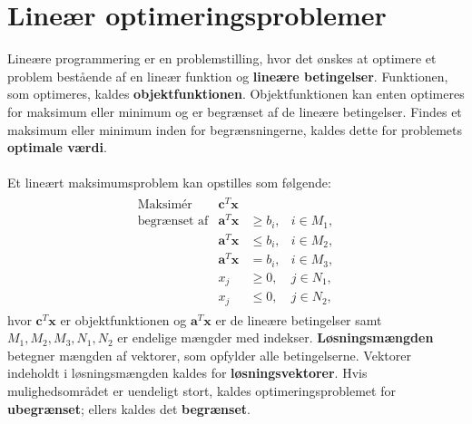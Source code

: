 \chapter{Lineær optimeringsproblemer}
%
Lineære programmering er en problemstilling, hvor det ønskes at optimere et problem bestående af en lineær funktion og \textbf{lineære betingelser}.
Funktionen, som optimeres, kaldes \textbf{objektfunktionen}.
Objektfunktionen kan enten optimeres for maksimum eller minimum og er begrænset af de lineære betingelser.
Findes et maksimum eller minimum inden for begrænsningerne, kaldes dette for problemets \textbf{optimale værdi}.
\\\\
%
Et lineært maksimumsproblem kan opstilles som følgende:
%
\begin{align*}
\begin{array}{lrll}
\text{Maksimér}		&\textbf{c}^T\textbf{x}	&			&\\
\text{begrænset af}	&\textbf{a}^T\textbf{x}	&\geq b_i,	&i \in M_1,\\
					&\textbf{a}^T\textbf{x}	&\leq b_i,	&i \in M_2,\\
					&\textbf{a}^T\textbf{x}	& = b_i,	&i \in M_3,\\
					&x_j					&\geq 0,	&j \in N_1,\\
					&x_j					&\leq 0,	&j \in N_2,
\end{array}
\end{align*}
%
hvor $\textbf{c}^T\textbf{x}$ er objektfunktionen og $\textbf{a}^T\textbf{x}$ er de lineære betingelser samt $M_1, M_2, M_3, N_1, N_2$ er endelige mængder med indekser.
\textbf{Løsningsmængden} betegner mængden af vektorer, som opfylder alle betingelserne.
Vektorer indeholdt i løsningsmængden kaldes for \textbf{løsningsvektorer}.
Hvis mulighedsområdet er uendeligt stort, kaldes optimeringsproblemet for \textbf{ubegrænset}; ellers kaldes det \textbf{begrænset}.\\\\
%
